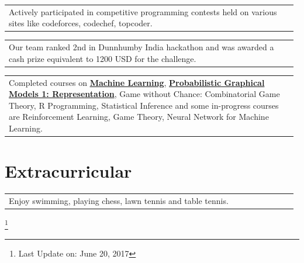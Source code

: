 \documentclass[a4paper]{article} %
\newcommand{\verticalspacing}{-0.25cm}
\newcommand{\bulletspace}{0.7cm}
\newcommand{\projectheadspacing}{6.9cm}
\newcommand{\skill}[2]{%
    \begin{tabular}{p{0.60\linewidth}r}
        \small {#2} & \multicolumn{1}{m{ \projectheadspacing{} }}{\raggedleft \textsc{\small #1}}\\
    \end{tabular}
    \vspace{\verticalspacing{}}
}
\newcommand{\lineskill}[2]{%
    \begin{tabular}{p{0.98\linewidth}r}
        \small {#2} & \multicolumn{1}{m{ \projectheadspacing{} }}{\raggedleft \textsc{\small #1}}\\
    \end{tabular}
    \vspace{\verticalspacing{}}
    \vspace{-0.0cm} %
}
\begin{document}

\lineskill
	{}
    {Actively participated in competitive programming contests held on various sites like codeforces, codechef, topcoder.}

\lineskill
	{}
	{Our team ranked 2nd in Dunnhumby India hackathon and was awarded a cash prize equivalent to 1200 USD for the challenge.}

\lineskill
	{}
	{Completed courses on \href{https://www.coursera.org/account/accomplishments/records/7A66NHG2A623}{\textbf{Machine Learning}}, \href{https://www.coursera.org/account/accomplishments/records/JRHRADFQSTAF}{\textbf{Probabilistic Graphical Models 1: Representation}}, Game without Chance: Combinatorial Game Theory, R Programming, Statistical Inference and some in-progress courses are Reinforcement Learning, Game Theory, Neural Network for Machine Learning.}
	



\section{Extracurricular}

\lineskill
    {}
    {Enjoy swimming, playing chess, lawn tennis and table tennis.}

\vspace{-0.65cm}
\let\thefootnote\relax\footnote{Last Update on: June 20, 2017}
\end{document}
